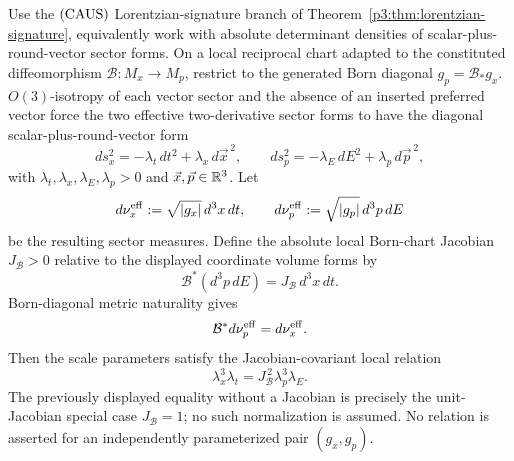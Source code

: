 \documentclass[12pt,a4paper]{article}
\begin{document}
\begin{theorem}
\label{p3:thm:dilation_identity}
\hfill \newline
Use the \(({\rm CAUS})\) Lorentzian-signature branch of
Theorem~\ref{p3:thm:lorentzian-signature}, equivalently work with absolute
determinant densities of scalar-plus-round-vector sector forms.  On a local
reciprocal chart adapted to the constituted diffeomorphism
\(\mathcal B:M_x\to M_p\), restrict to the generated Born diagonal
\(g_p=\mathcal B_*g_x\).  \(O(3)\)-isotropy of each vector sector and the
absence of an inserted preferred vector force the two effective
two-derivative sector forms to have the diagonal scalar-plus-round-vector form
\[
ds_x^2=-\lambda_t\,dt^2+\lambda_x\,d\vec{x}^{\,2},
\qquad
ds_p^2=-\lambda_E\,dE^2+\lambda_p\,d\vec{p}^{\,2},
\]
with \(\lambda_t,\lambda_x,\lambda_E,\lambda_p>0\) and \(\vec{x},\vec{p}\in\mathbb{R}^3\).  Let
\[
 d\nu_x^{\rm eff}:=\sqrt{|g_x|}\,d^3x\,dt,
 \qquad
 d\nu_p^{\rm eff}:=\sqrt{|g_p|}\,d^3p\,dE
\]
be the resulting sector measures.  Define the absolute local Born-chart
Jacobian \(J_{\mathcal B}>0\) relative to the displayed coordinate volume
forms by
\begin{equation}
 \mathcal B^*(d^3p\,dE)
 =J_{\mathcal B}\,d^3x\,dt.
 \label{p3:eq:born-chart-jacobian}
\end{equation}
Born-diagonal metric naturality gives
\begin{equation}
\label{p3:eq:sectorwise-born-balanced-measure}
 \mathcal B^*d\nu_p^{\rm eff}=d\nu_x^{\rm eff}.
\end{equation}
Then the scale parameters satisfy the Jacobian-covariant local relation
\begin{equation}
\boxed{\ \lambda_x^{3}\lambda_t
       =J_{\mathcal B}^{\,2}\lambda_p^{3}\lambda_E.\ }
\label{p3:eq:dilation_cubic}
\end{equation}
The previously displayed equality without a Jacobian is precisely the
unit-Jacobian special case \(J_{\mathcal B}=1\); no such normalization is
assumed.  No relation is asserted for an independently parameterized pair
\((g_x,g_p)\).
\end{theorem}
\end{document}
